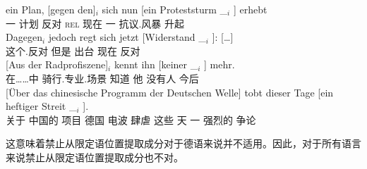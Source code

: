 \begin{sloppypar}
\ex 
\gll ein Plan, [gegen den]$_i$ sich nun [ein Proteststurm \_$_i$ ] erhebt\footnotemark\\
     一 计划 \spacebr{}反对 \textsc{rel}  现在 \spacebr{}一 抗议.风暴 {} {} 升起\\
\ex 
\gll {}Dagegen$_i$ jedoch regt sich jetzt [Widerstand \_$_i$ ]: [\ldots]\footnotemark\\
	{}这个.反对 但是 出台  现在 \spacebr{}反对 {}\\
\ex
\gll {}[Aus der Radprofiszene]$_i$ kennt ihn [keiner \_$_i$ ] mehr.\footnotemark\\
	 {}\spacebr{}在……中  骑行.专业.场景 知道 他 \spacebr{}没有人 {} {} 今后\\
\ex 
\gll {}[Über das chinesische Programm der Deutschen Welle] tobt dieser Tage [ein heftiger Streit \_$_i$ ].\footnotemark\\
     \spacebr{}关于  中国的 项目  德国 电波 肆虐 这些 天 \spacebr{}一 强烈的 争论\\
\zl
\end{sloppypar}

\noindent
这意味着禁止从限定语位置提取成分对于德语来说并不适用。因此，对于所有语言来说禁止从限定语位置提取成分也不对。


